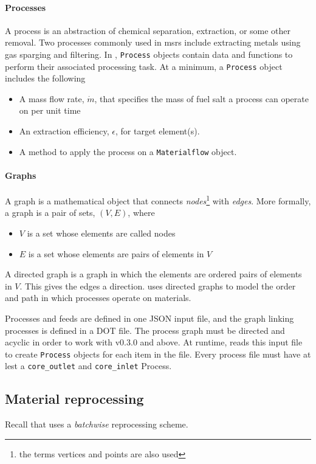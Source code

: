 \paragraph{Processes}
    A process is an abstraction of chemical separation, extraction, or some
    other removal. Two processes commonly used in \Gls{msr}s include
    extracting metals using gas sparging and filtering. In \SaltProc,
    \verb.Process. objects contain data and functions to perform their
    associated processing task. At a minimum, a \verb.Process. object includes
    the following
    \begin{itemize}
        \item A mass flow rate, $\dot{m}$, that specifies the mass of fuel salt a process can operate on per unit time
        \item An extraction efficiency, $\epsilon$, for target element(s).
        \item A method to apply the process on a \verb.Materialflow. object. 
    \end{itemize}

\paragraph{Graphs}
    A graph is a mathematical object that connects {\it nodes}\footnote{the
    terms vertices and points are also used} with {\it edges}. More formally,
    a graph is a pair of sets, $(V, E)$, where
    \begin{itemize}
        \item $V$ is a set whose elements are called nodes
        \item $E$ is a set whose elements are pairs of elements in $V$
    \end{itemize}
    A directed graph is a graph in which the elements are ordered pairs of elements
    in $V$. This gives the edges a direction. \SaltProc uses directed graphs to
    model the order and path in which processes operate on materials.
        
Processes and feeds are defined in one JSON input file, and the graph linking
processes is defined in a DOT file. The process graph must be directed and
acyclic in order to work with \SaltProc v0.3.0 and above. At runtime,
\SaltProc reads this input file to create \verb.Process. objects for each item
in the file. Every process file must have at lest a \verb.core_outlet. and
\verb.core_inlet. Process.

\subsection{Material reprocessing}
Recall that \SaltProc uses a {\it batchwise} reprocessing scheme.

